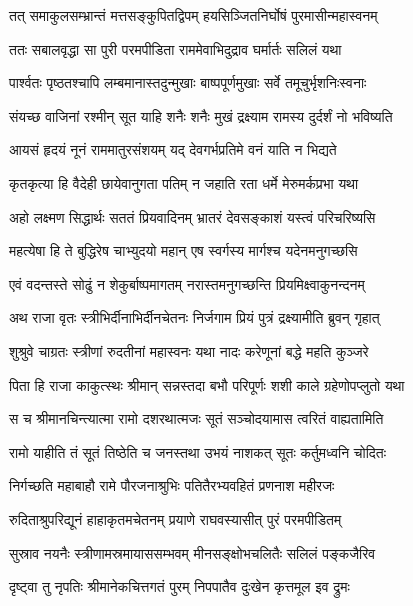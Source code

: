 \twolineshloka
{तत् समाकुलसम्भ्रान्तं मत्तसङ्कुपितद्विपम्}
{हयसिञ्जितनिर्घोषं पुरमासीन्महास्वनम्} %

\twolineshloka
{ततः सबालवृद्धा सा पुरी परमपीडिता}
{राममेवाभिदुद्राव घर्मार्तः सलिलं यथा} %

\twolineshloka
{पार्श्वतः पृष्ठतश्चापि लम्बमानास्तदुन्मुखाः}
{बाष्पपूर्णमुखाः सर्वे तमूचुर्भृशनिःस्वनाः} %

\twolineshloka
{संयच्छ वाजिनां रश्मीन् सूत याहि शनैः शनैः}
{मुखं द्रक्ष्याम रामस्य दुर्दर्शं नो भविष्यति} %

\twolineshloka
{आयसं हृदयं नूनं राममातुरसंशयम्}
{यद् देवगर्भप्रतिमे वनं याति न भिद्यते} %

\twolineshloka
{कृतकृत्या हि वैदेही छायेवानुगता पतिम्}
{न जहाति रता धर्मे मेरुमर्कप्रभा यथा} %

\twolineshloka
{अहो लक्ष्मण सिद्धार्थः सततं प्रियवादिनम्}
{भ्रातरं देवसङ्काशं यस्त्वं परिचरिष्यसि} %

\twolineshloka
{महत्येषा हि ते बुद्धिरेष चाभ्युदयो महान्}
{एष स्वर्गस्य मार्गश्च यदेनमनुगच्छसि} %

\twolineshloka
{एवं वदन्तस्ते सोढुं न शेकुर्बाष्पमागतम्}
{नरास्तमनुगच्छन्ति प्रियमिक्ष्वाकुनन्दनम्} %

\twolineshloka
{अथ राजा वृतः स्त्रीभिर्दीनाभिर्दीनचेतनः}
{निर्जगाम प्रियं पुत्रं द्रक्ष्यामीति ब्रुवन् गृहात्} %

\twolineshloka
{शुश्रुवे चाग्रतः स्त्रीणां रुदतीनां महास्वनः}
{यथा नादः करेणूनां बद्धे महति कुञ्जरे} %

\twolineshloka
{पिता हि राजा काकुत्स्थः श्रीमान् सन्नस्तदा बभौ}
{परिपूर्णः शशी काले ग्रहेणोपप्लुतो यथा} %

\twolineshloka
{स च श्रीमानचिन्त्यात्मा रामो दशरथात्मजः}
{सूतं सञ्चोदयामास त्वरितं वाह्यतामिति} %

\twolineshloka
{रामो याहीति तं सूतं तिष्ठेति च जनस्तथा}
{उभयं नाशकत् सूतः कर्तुमध्वनि चोदितः} %

\twolineshloka
{निर्गच्छति महाबाहौ रामे पौरजनाश्रुभिः}
{पतितैरभ्यवहितं प्रणनाश महीरजः} %

\twolineshloka
{रुदिताश्रुपरिद्यूनं हाहाकृतमचेतनम्}
{प्रयाणे राघवस्यासीत् पुरं परमपीडितम्} %

\twolineshloka
{सुस्राव नयनैः स्त्रीणामस्रमायाससम्भवम्}
{मीनसङ्क्षोभचलितैः सलिलं पङ्कजैरिव} %

\twolineshloka
{दृष्ट्वा तु नृपतिः श्रीमानेकचित्तगतं पुरम्}
{निपपातैव दुःखेन कृत्तमूल इव द्रुमः} %


